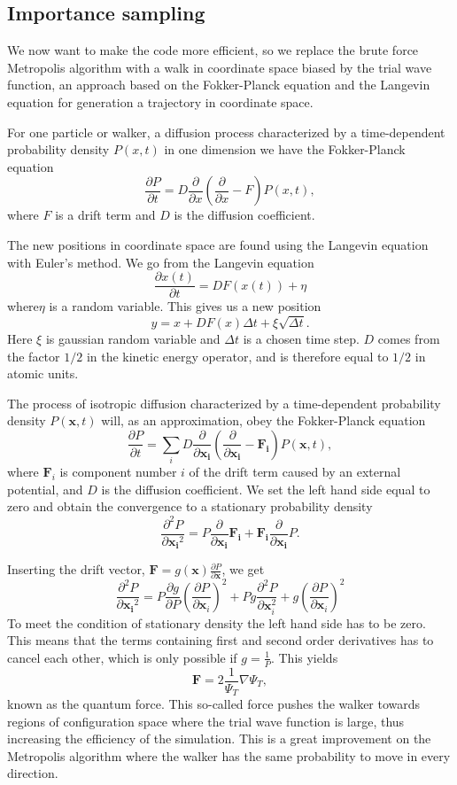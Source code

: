 \documentclass[11pt]{article}
\begin{document}
\subsection{Importance sampling}

We now want to make the code more efficient, so we replace the brute
force Metropolis algorithm with a walk in coordinate space biased
by the trial wave function, an approach based on the Fokker-Planck
equation and the Langevin equation for generation a trajectory in
coordinate space. 

For one particle or walker, a diffusion process characterized by a
time-dependent probability density $P\left(x,t\right)$ in one dimension
we have the Fokker-Planck equation
\[
\frac{\partial P}{\partial t}=D\frac{\partial}{\partial x}\left(\frac{\partial}{\partial x}-F\right)P\left(x,t\right),
\]
where $F$ is a drift term and $D$ is the diffusion coefficient. 

The new positions in coordinate space are found using the Langevin
equation with Euler's method. We go from the Langevin equation
\[
\frac{\partial x(t)}{\partial t}=DF(x(t))+\eta
\]
where$\eta$ is a random variable. This gives us a new position
\[
y=x+DF(x)\Delta t+\xi\sqrt{\Delta t}.
\]
Here $\xi$ is gaussian random variable and $\Delta t$ is a chosen
time step. $D$ comes from the factor $1/2$ in the kinetic energy
operator, and is therefore equal to $1/2$ in atomic units.

The process of isotropic diffusion characterized by a time-dependent
probability density $P\left(\mathbf{x},t\right)$ will, as an approximation,
obey the Fokker-Planck equation
\[
\frac{\partial P}{\partial t}=\sum_{i}D\frac{\partial}{\partial\mathbf{x_{i}}}\left(\frac{\partial}{\partial\mathbf{x_{i}}}-\mathbf{F_{i}}\right)P(\mathbf{x},t),
\]
where $\mathbf{F}_{i}$ is component number $i$ of the drift term
caused by an external potential, and $D$ is the diffusion coefficient.
We set the left hand side equal to zero and obtain the convergence
to a stationary probability density
\[
\frac{\partial^{2}P}{\partial{\mathbf{x_{i}}^{2}}}=P\frac{\partial}{\partial{\mathbf{x_{i}}}}\mathbf{F_{i}}+\mathbf{F_{i}}\frac{\partial}{\partial{\mathbf{x_{i}}}}P.
\]


Inserting the drift vector, $\mathbf{F}=g(\mathbf{x})\frac{\partial P}{\partial\mathbf{x}}$,
we get
\[
\frac{\partial^{2}P}{\partial{\mathbf{x_{i}}^{2}}}=P\frac{\partial g}{\partial P}\left(\frac{\partial P}{\partial{\mathbf{x}_{i}}}\right)^{2}+Pg\frac{\partial^{2}P}{\partial{\mathbf{x}_{i}^{2}}}+g\left(\frac{\partial P}{\partial{\mathbf{x}_{i}}}\right)^{2}
\]
To meet the condition of stationary density the left hand side has
to be zero. This means that the terms containing first and second
order derivatives has to cancel each other, which is only possible
if $g=\frac{1}{P}$. This yields
\[
\mathbf{F}=2\frac{1}{\Psi_{T}}\nabla\Psi_{T},
\]
known as the quantum force. This so-called force pushes the walker
towards regions of configuration space where the trial wave function
is large, thus increasing the efficiency of the simulation. This is
a great improvement on the Metropolis algorithm where the walker has
the same probability to move in every direction.
\end{document}

